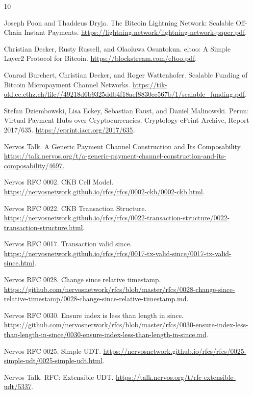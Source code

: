 \documentclass[a4paper,11pt]{article}
\begin{document}
\clearpage
\begin{thebibliography}{10}
\raggedright

Joseph Poon and Thaddeus Dryja.
\newblock The Bitcoin Lightning Network: Scalable Off-Chain Instant Payments.
\newblock \url{https://lightning.network/lightning-network-paper.pdf}.

Christian Decker, Rusty Russell, and Olaoluwa Osuntokun.
\newblock eltoo: A Simple Layer2 Protocol for Bitcoin.
\newblock \url{https://blockstream.com/eltoo.pdf}.

Conrad Burchert, Christian Decker, and Roger Wattenhofer.
\newblock Scalable Funding of Bitcoin Micropayment Channel Networks.
\newblock \url{https://tik-old.ee.ethz.ch/file//49218d6b9325ddb4f18aef8830ec567b/1/scalable_funding.pdf}.

Stefan Dziembowski, Lisa Eckey, Sebastian Faust, and Daniel Malinowski.
\newblock Perun: Virtual Payment Hubs over Cryptocurrencies.
\newblock Cryptology ePrint Archive, Report 2017/635.
\newblock \url{https://eprint.iacr.org/2017/635}.

Nervos Talk.
\newblock A Generic Payment Channel Construction and Its Composability.
\newblock \url{https://talk.nervos.org/t/a-generic-payment-channel-construction-and-its-composability/4697}.

Nervos RFC 0002.
\newblock CKB Cell Model.
\newblock \url{https://nervosnetwork.github.io/rfcs/rfcs/0002-ckb/0002-ckb.html}.

Nervos RFC 0022.
\newblock CKB Transaction Structure.
\newblock \url{https://nervosnetwork.github.io/rfcs/rfcs/0022-transaction-structure/0022-transaction-structure.html}.

Nervos RFC 0017.
\newblock Transaction valid since.
\newblock \url{https://nervosnetwork.github.io/rfcs/rfcs/0017-tx-valid-since/0017-tx-valid-since.html}.

Nervos RFC 0028.
\newblock Change since relative timestamp.
\newblock \url{https://github.com/nervosnetwork/rfcs/blob/master/rfcs/0028-change-since-relative-timestamp/0028-change-since-relative-timestamp.md}.

Nervos RFC 0030.
\newblock Ensure index is less than length in since.
\newblock \url{https://github.com/nervosnetwork/rfcs/blob/master/rfcs/0030-ensure-index-less-than-length-in-since/0030-ensure-index-less-than-length-in-since.md}.

Nervos RFC 0025.
\newblock Simple UDT.
\newblock \url{https://nervosnetwork.github.io/rfcs/rfcs/0025-simple-udt/0025-simple-udt.html}.

Nervos Talk.
\newblock RFC: Extensible UDT.
\newblock \url{https://talk.nervos.org/t/rfc-extensible-udt/5337}.

\end{thebibliography}
\end{document}
